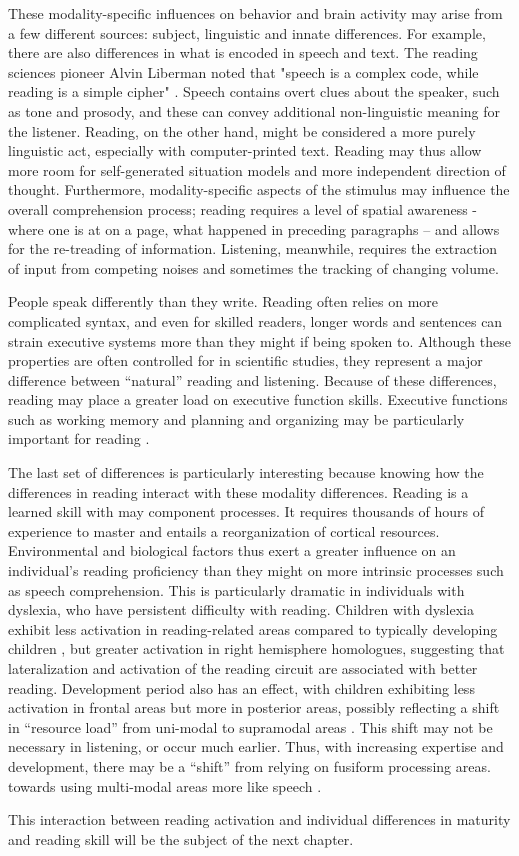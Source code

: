 These modality-specific influences on behavior and brain activity may arise from a few different sources: subject, linguistic and innate differences. For example, there are also differences in what is encoded in speech and text. The reading sciences pioneer Alvin Liberman noted that "speech is a complex code, while reading is a simple cipher" \cite{Mattingly1971}. Speech contains overt clues about the speaker, such as tone and prosody, and these can convey additional non-linguistic meaning for the listener. Reading, on the other hand, might be considered a more purely linguistic act, especially with computer-printed text. Reading may thus allow more room for self-generated situation models and more independent direction of thought. Furthermore, modality-specific aspects of the stimulus may influence the overall comprehension process; reading requires a level of spatial awareness -where one is at on a page, what happened in preceding paragraphs – and allows for the re-treading of information. Listening, meanwhile, requires the extraction of input from competing noises and sometimes the tracking of changing volume. 

People speak differently than they write. Reading often relies on more complicated syntax, and even for skilled readers, longer words and sentences can strain executive systems more than they might if being spoken to. Although these properties are often controlled for in scientific studies, they represent a major difference between “natural” reading and listening. Because of these differences, reading may place a greater load on executive function skills. Executive functions such as working memory and planning and organizing may be particularly important for reading \citep{Cain2006}.  

The last set of differences is particularly interesting because knowing how the differences in reading interact with these modality differences. Reading is a learned skill with may component processes. It requires thousands of hours of experience to master and entails a reorganization of cortical resources. Environmental and biological factors thus exert a greater influence on an individual’s reading proficiency than they might on more intrinsic processes such as speech comprehension. This is particularly dramatic in individuals with dyslexia, who have persistent difficulty with reading. Children with dyslexia exhibit less activation in reading-related areas compared to typically developing children \citep{Pugh2000}, but greater activation in right hemisphere homologues, suggesting that lateralization and activation of the reading circuit are associated with better reading. Development period also has an effect, with children exhibiting less activation in frontal areas but more in posterior areas, possibly reflecting a shift in “resource load” from uni-modal to supramodal areas \citep{Berl2011}. This shift may not be necessary in listening, or occur much earlier. Thus, with increasing expertise and development, there may be a “shift” from relying on fusiform processing areas. towards using multi-modal areas more like speech \citep{Monzalvo2013}. 

This interaction between reading activation and individual differences in maturity and reading skill will be the subject of the next chapter.